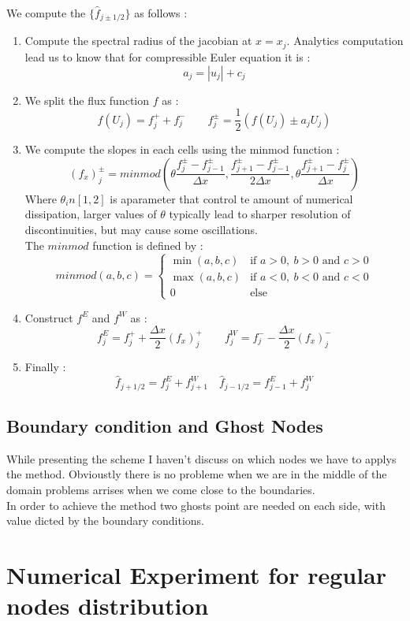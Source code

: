 \documentclass[a4paper,12pt]{article}
\begin{document}
We compute the $\{\hat{f}_{j\pm 1/2}\}$ as follows : 
\begin{enumerate}
\item Compute the spectral radius of the jacobian at $x=x_j$. Analytics computation lead us to know that for compressible Euler equation it is : 
$$
a_j = |u_j| + c_j
$$
\item We split the flux function $f$ as : 
$$
f(U_j)=f^+_j+f^-_j \qquad f^{\pm}_j = \frac{1}{2}\left(f(U_j)\pm a_jU_j\right)
$$
\item We compute the slopes in each cells using the minmod function : 
$$
(f_x)^{\pm}_j = minmod\left(\theta\frac{f^{\pm}_{j}-f^{\pm}_{j-1}}{\Delta x}, \frac{f^{\pm}_{j+1}-f^{\pm}_{j-1}}{2\Delta x},\theta\frac{f^{\pm}_{j+1}-f^{\pm}_{j}}{\Delta x} \right)
$$
Where $\theta_in[1,2]$ is  aparameter that control te amount of numerical dissipation, larger values of $\theta$ typically lead to sharper resolution of discontinuities, but may cause some oscillations.\\
The $minmod$ function is defined by : 
$$
minmod(a,b,c)=\left\{ \begin{array}{cl}
\min(a,b,c) & \text{if } a>0,\ b>0\text{ and } c>0\\
\max(a,b,c) & \text{if } a<0,\ b<0\text{ and } c<0\\
0& \text{else}
\end{array}\right.
$$
\item Construct $f^E$ and $f^W$ as : 
$$
f^E_j = f^+_j + \frac{\Delta x}{2}(f_x)^+_j \qquad f^W_j = f^-_j-\frac{\Delta x}{2}(f_x)^-_j
$$
\item Finally : 
$$
\hat{f}_{j+1/2} = f^E_j + f^W_{j+1} \quad \hat{f}_{j-1/2} = f^E_{j-1} + f^W_{j}
$$
\end{enumerate}

\subsection{Boundary condition and Ghost Nodes}
While presenting the scheme I haven't discuss on which nodes we have to applys the method. Obvioustly there is no probleme when we are in the middle of the domain problems arrises when we come close to the boundaries. \\
In order to achieve the method two ghosts point are needed on each side, with value dicted by the boundary conditions. 

\section{Numerical Experiment for regular nodes distribution}
\end{document}
